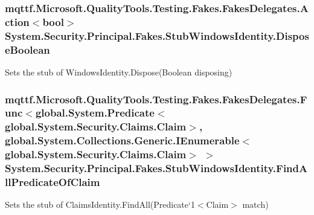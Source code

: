 \hypertarget{class_system_1_1_security_1_1_principal_1_1_fakes_1_1_stub_windows_identity_a94200b1d0f6af6d5f146aca6062b6552}{
\subsubsection[{Dispose\-Boolean}]{\setlength{\rightskip}{0pt plus 5cm}mqttf.\-Microsoft.\-Quality\-Tools.\-Testing.\-Fakes.\-Fakes\-Delegates.\-Action$<$bool$>$ System.\-Security.\-Principal.\-Fakes.\-Stub\-Windows\-Identity.\-Dispose\-Boolean}}\label{class_system_1_1_security_1_1_principal_1_1_fakes_1_1_stub_windows_identity_a94200b1d0f6af6d5f146aca6062b6552}


Sets the stub of Windows\-Identity.\-Dispose(\-Boolean disposing)

\hypertarget{class_system_1_1_security_1_1_principal_1_1_fakes_1_1_stub_windows_identity_a26fbef46557a7d316a479aeaef085b69}{
\subsubsection[{Find\-All\-Predicate\-Of\-Claim}]{\setlength{\rightskip}{0pt plus 5cm}mqttf.\-Microsoft.\-Quality\-Tools.\-Testing.\-Fakes.\-Fakes\-Delegates.\-Func$<$global.\-System.\-Predicate$<$global.\-System.\-Security.\-Claims.\-Claim$>$, global.\-System.\-Collections.\-Generic.\-I\-Enumerable$<$global.\-System.\-Security.\-Claims.\-Claim$>$ $>$ System.\-Security.\-Principal.\-Fakes.\-Stub\-Windows\-Identity.\-Find\-All\-Predicate\-Of\-Claim}}\label{class_system_1_1_security_1_1_principal_1_1_fakes_1_1_stub_windows_identity_a26fbef46557a7d316a479aeaef085b69}


Sets the stub of Claims\-Identity.\-Find\-All(Predicate`1$<$Claim$>$ match)

